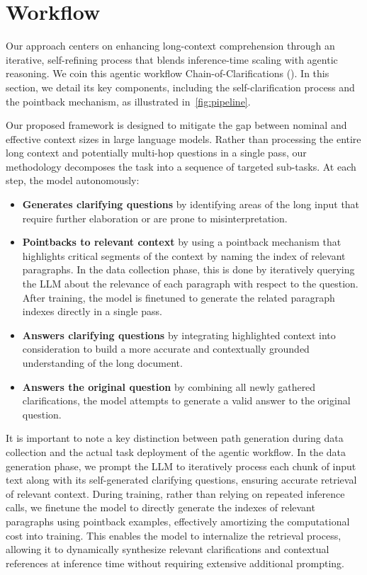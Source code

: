 \section{\coclong Workflow}
\label{sec:methodology}
Our approach centers on enhancing long-context comprehension through an iterative, self-refining process that blends inference-time scaling with agentic reasoning. 
We coin this agentic workflow Chain-of-Clarifications (\coc).
In this section, we detail its key components, including the self-clarification process and the pointback mechanism, as illustrated in~\cref{fig:pipeline}.

Our proposed \coc framework is designed to mitigate the gap between nominal and effective context sizes in large language models. 
Rather than processing the entire long context and potentially multi-hop questions in a single pass, our methodology decomposes the task into a sequence of targeted sub-tasks. At each \coc step, the model autonomously:

\begin{itemize}
    \item \textbf{Generates clarifying questions} by identifying areas of the long input that require further elaboration or are prone to misinterpretation.
    \item \textbf{Pointbacks to relevant context} by using a pointback mechanism that highlights critical segments of the context by naming the index of relevant paragraphs. 
    In the data collection phase, this is done by iteratively querying the LLM about the relevance of each paragraph with respect to the question.
    After training, the model is finetuned to generate the related paragraph indexes directly in a single pass.  
    \item \textbf{Answers clarifying questions} by integrating highlighted context into consideration to build a more accurate and contextually grounded understanding of the long document.
    \item \textbf{Answers the original question} by combining all newly gathered clarifications, the model attempts to generate a valid answer to the original question.
\end{itemize}

It is important to note a key distinction between \coc path generation during data collection and the actual task deployment of the agentic workflow. In the data generation phase, we prompt the LLM to iteratively process each chunk of input text along with its self-generated clarifying questions, ensuring accurate retrieval of relevant context. 
During training, rather than relying on repeated inference calls, we finetune the model to directly generate the indexes of relevant paragraphs using pointback examples, effectively amortizing the computational cost into training. This enables the model to internalize the retrieval process, allowing it to dynamically synthesize relevant clarifications and contextual references at inference time without requiring extensive additional prompting.


